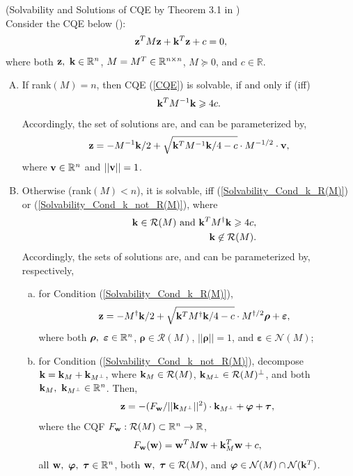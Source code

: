 \documentclass{imaman}
\newcommand{\beq}{\begin{eqnarray}}
\newcommand{\eeq}{\end{eqnarray}}
\newcommand{\bfw}{{\bf w}}
\newcommand{\bfk}{{\bf k}}
\newcommand{\bfz}{{\bf z}}
\newcommand{\bfv}{{\bf v}}
\newcommand{\bfrho}{{\boldsymbol \rho}}
\newcommand{\bftau}{{\boldsymbol \tau}}
\newcommand{\bfvarepsilon}{{\boldsymbol \varepsilon}}
\newcommand{\bfvarphi}{{\boldsymbol \varphi}}
\newcommand{\calN}{{\mathcal N}}
\newcommand{\calR}{{\mathcal R}}
\newcommand{\itn}{{\it n}}
\numberwithin{equation}{section}
\begin{document}
\begin{lemma} (Solvability and Solutions of CQE by Theorem {\rm 3.1} in {\rm \cite{LiLiHs:20}})\\
Consider the CQE below ({\rm \cite{Lu(Ye):03(16)}}):
\beq
\bfz^TM\bfz+\bfk^T\bfz+c=0,
\label{CQE}
\eeq
where both $\bfz,~\bfk\in\mathbb{R}^{\it n}$, $M=M^T\in\mathbb{R}^{{\it n}\times {\it n}}$, $M\succeq 0$, and $c\in\mathbb{R}$.
\begin{enumerate}[A)]
\item\label{Lem_Solutions_n} If rank$(M)=n$, then CQE {\rm(\ref{CQE})} is solvable, if and only if (iff)
    \beq
    \bfk^TM^{-1}\bfk\ge 4c.
    \label{Solvability_Cond_n}
    \eeq
    Accordingly, the set of solutions are, and can be parameterized by,
    \beq
    \bfz=-M^{-1}\bfk/2+\sqrt{\bfk^TM^{-1}\bfk/4-c}\cdot M^{-1/2}\cdot \bfv,
    \label{Solution_n}
    \eeq
    where $\bfv\in\mathbb{R}^{\it n}$ and $||\bfv||=1$.
\item\label{Lem_Solutions_r} Otherwise (rank$(M)<n$), it is solvable, iff {\rm(\ref{Solvability_Cond_k_R(M)})} or {\rm(\ref{Solvability_Cond_k_not_R(M)})}, where
    \beq
    &&\bfk\in \calR(M)~\mbox{and}~\bfk^TM^\dagger\bfk\ge 4c,\label{Solvability_Cond_k_R(M)}\\
    &&\bfk\not\in \calR(M).\label{Solvability_Cond_k_not_R(M)}
    \eeq
    Accordingly, the sets of solutions are, and can be parameterized by, respectively,
    \begin{enumerate}[a)]
    \item\label{Lem_Solutions_r_k_R(M)} for Condition {\rm(\ref{Solvability_Cond_k_R(M)})},
        \beq
        \bfz=-M^\dagger\bfk/2+\sqrt{\bfk^TM^\dagger \bfk/4-c}\cdot M^{\dagger/2}\bfrho+\bfvarepsilon,~~
        \label{Solution_k_R(M)}
        \eeq
        where both $\bfrho,~\bfvarepsilon\in\mathbb{R}^{\it n}$, $\bfrho\in \calR(M)$, $||\bfrho||=1$, and $\bfvarepsilon\in \calN(M)$;
    \item\label{Lem_Solutions_r_k_not_R(M)} for Condition {\rm(\ref{Solvability_Cond_k_not_R(M)})}, decompose $\bfk=\bfk_M+\bfk_{M^\perp}$, where $\bfk_M\in \calR(M)$, $\bfk_{M^\perp}\in \calR(M)^\perp$, and both $\bfk_M,~\bfk_{M^\perp}\in\mathbb{R}^\itn$. Then,
        \beq
        \bfz=-(F_\bfw/||\bfk_{M^\perp}||^2)\cdot\bfk_{M^\perp}+\bfvarphi+\bftau,
        \label{Solution_k_not_R(M)}
        \eeq
        where the CQF $F_\bfw: \calR(M)\subset\mathbb{R}^\itn\rightarrow\mathbb{R}$,
        \beq
        F_\bfw(\bfw)=\bfw^TM\bfw+\bfk_M^T\bfw+c,
        \label{CQF_Solution_k_not_R(M)}
        \eeq
        all $\bfw,~\bfvarphi,~\bftau\in\mathbb{R}^{\it n}$, both $\bfw,~\bftau\in \calR(M)$, and $\bfvarphi\in \calN(M)\cap \calN(\bfk^T)$.
    \end{enumerate}
\end{enumerate}
\label{Lem_Solutions}
\end{lemma}
\end{document}
